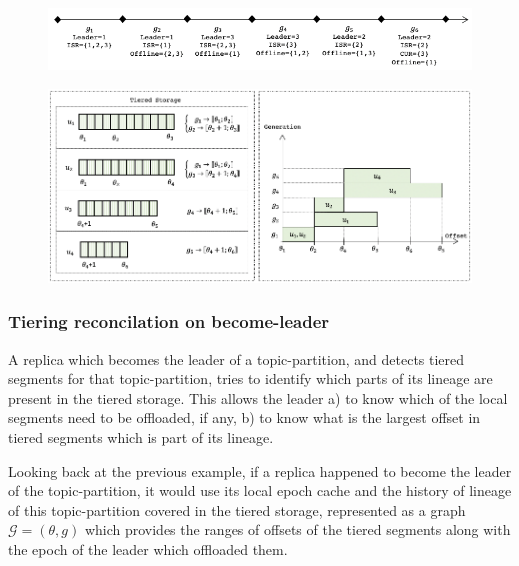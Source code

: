 \documentclass{article}
\begin{document}
\begin{figure}[h!]
	\centering
	\includegraphics[scale=0.6]{seq-generations.png}
	\label{fig:seq-generations}
\end{figure}

\begin{figure}[h!]
	\centering
	\includegraphics[scale=0.6]{tiered-storage.png}
	\label{fig:tiered-storage}
\end{figure}

\subsubsection{Tiering reconcilation on become-leader}

A replica which becomes the leader of a topic-partition, and detects tiered segments for that topic-partition, tries to identify which parts of its lineage are present in the tiered storage. This allows the leader a) to know which of the local segments need to be offloaded, if any, b) to know what is the largest offset in tiered segments which is part of its lineage.

Looking back at the previous example, if a replica happened to become the leader of the topic-partition, it would use its local epoch cache and the history of lineage of this topic-partition covered in the tiered storage, represented as a graph $\mathcal{G}=(\theta,g)$ which provides the ranges of offsets of the tiered segments along with the epoch of the leader which offloaded them.
\end{document}

